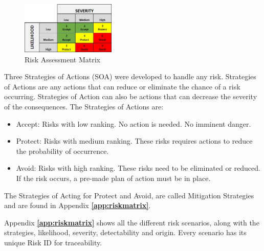 \begin{figure}[H]
    \centering
    \includegraphics[width = 0.4\textwidth]{VAPIQ-PICTURES/RiskAss.jpg}
    \caption{Risk Assessment Matrix}
    \label{AssRisk}
\end{figure}
\medskip
Three Strategies of Actions (SOA) were developed to handle any risk. Strategies of Actions are any actions that can reduce or eliminate the chance of a risk occurring. Strategies of Action can also be actions that can decrease the severity of the consequences. The Strategies of Actions are:
\begin{itemize}
\item{Accept: Risks with low ranking. No action is needed. No imminent danger.}
\item{Protect: Risks with medium ranking. These risks requires actions to reduce the probability of occurrence.}
\item{Avoid: Risks with high ranking. These risks need to be eliminated or reduced. If the risk occurs, a pre-made plan of action must be in place.}
\end{itemize}\medskip

The Strategies of Acting for Protect and Avoid, are called Mitigation Strategies and are found in Appendix \textbf{\ref{app:riskmatrix}}. \bigskip

Appendix \textbf{\ref{app:riskmatrix}} shows all the different risk scenarios, along with the strategies, likelihood, severity, detectability and origin. Every scenario has its unique Risk ID for traceability.

